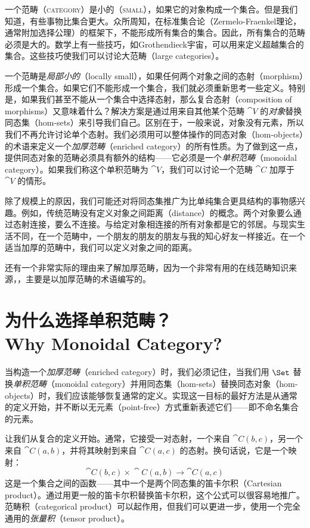 
\lettrine[lhang=0.17]{一}{个范畴（category）是小的（small）}，如果它的对象构成一个集合。但是我们知道，有些事物比集合更大。众所周知，在标准集合论（Zermelo-Fraenkel理论，通常附加选择公理）的框架下，不能形成所有集合的集合。因此，所有集合的范畴必须是大的。数学上有一些技巧，如Grothendieck宇宙，可以用来定义超越集合的集合。这些技巧使我们可以讨论大范畴（large categories）。

一个范畴是\emph{局部小的}（locally small），如果任何两个对象之间的态射（morphism）形成一个集合。如果它们不能形成一个集合，我们就必须重新思考一些定义。特别是，如果我们甚至不能从一个集合中选择态射，那么复合态射（composition of morphisms）又意味着什么？解决方案是通过用来自其他某个范畴 $\cat{V}$ 的\emph{对象}替换同态集（hom-sets）来引导我们自己。区别在于，一般来说，对象没有元素，所以我们不再允许讨论单个态射。我们必须用可以整体操作的同态对象（hom-objects）的术语来定义一个\emph{加厚范畴}（enriched category）的所有性质。为了做到这一点，提供同态对象的范畴必须具有额外的结构——它必须是一个\emph{单积范畴}（monoidal category）。如果我们称这个单积范畴为 $\cat{V}$，我们可以讨论一个范畴 $\cat{C}$ 加厚于 $\cat{V}$ 的情形。

除了规模上的原因，我们可能还对将同态集推广为比单纯集合更具结构的事物感兴趣。例如，传统范畴没有定义对象之间距离（distance）的概念。两个对象要么通过态射连接，要么不连接。与给定对象相连接的所有对象都是它的邻居。与现实生活不同，在一个范畴中，一个朋友的朋友的朋友与我的知心好友一样接近。在一个适当加厚的范畴中，我们可以定义对象之间的距离。

还有一个非常实际的理由来了解加厚范畴，因为一个非常有用的在线范畴知识来源，，主要是以加厚范畴的术语编写的。

\section{为什么选择单积范畴？\\ \textmd{Why Monoidal Category?}}

当构造一个\emph{加厚范畴}（enriched category）时，我们必须记住，当我们用 $\Set$ 替换\emph{单积范畴}（monoidal category）并用同态集（hom-sets）替换同态对象（hom-objects）时，我们应该能够恢复通常的定义。实现这一目标的最好方法是从通常的定义开始，并不断以无元素（point-free）方式重新表述它们——即不命名集合的元素。

让我们从复合的定义开始。通常，它接受一对态射，一个来自 $\cat{C}(b, c)$，另一个来自 $\cat{C}(a, b)$，并将其映射到来自 $\cat{C}(a, c)$ 的态射。换句话说，它是一个映射：
\[\cat{C}(b, c)\times{}\cat{C}(a, b) \to \cat{C}(a, c)\]
这是一个集合之间的函数——其中一个是两个同态集的笛卡尔积（Cartesian product）。通过用更一般的笛卡尔积替换笛卡尔积，这个公式可以很容易地推广。范畴积（categorical product）可以起作用，但我们可以更进一步，使用一个完全通用的\emph{张量积}（tensor product）。

